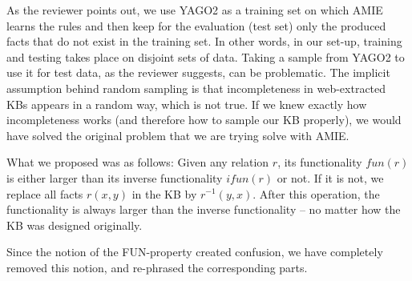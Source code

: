       As the reviewer points out, we use YAGO2 as a training set on which AMIE learns the rules and then keep for the evaluation (test set) only the produced facts that do not exist in the training set.
      In other words, in our set-up, training and testing takes place on disjoint sets of data.
      Taking a sample from YAGO2 to use it for test data, as the reviewer suggests, can be problematic. The implicit assumption behind random sampling is that incompleteness in
      web-extracted KBs appears in a random way, which is not true. If we knew exactly how incompleteness works (and therefore how to sample our KB properly), we would have solved the original
      problem that we are trying solve with AMIE.


	  What we proposed was as follows: Given any relation $r$, its functionality $fun(r)$ is either larger than its inverse functionality $ifun(r)$ or not. If it is not, we replace all facts $r(x,y)$ in the KB by $r^{-1}(y,x)$. After this operation, the functionality is always larger than the inverse functionality -- no matter how the KB was designed originally.

      Since the notion of the FUN-property created confusion, we have completely removed this notion, and re-phrased the corresponding parts.



